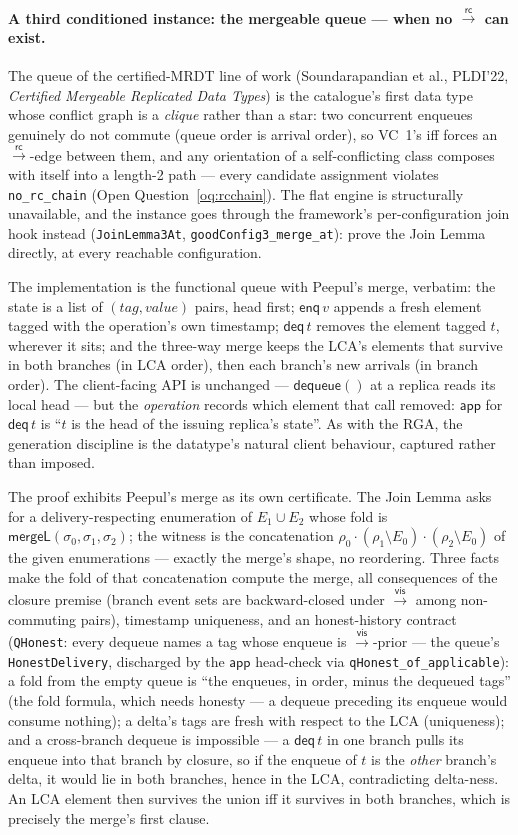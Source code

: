 \documentclass[11pt]{article}
\newcommand{\vis}{\xrightarrow{\mathsf{vis}}}
\newcommand{\rc}{\xrightarrow{\mathsf{rc}}}
\newcommand{\lean}[1]{\texttt{#1}}
\newcommand{\app}{\mathsf{app}}
\begin{document}
\paragraph{A third conditioned instance: the mergeable queue --- when no
$\rc$ can exist.} The queue of the certified-MRDT line of work
(Soundarapandian et al., PLDI'22, \emph{Certified Mergeable Replicated Data
Types}) is the catalogue's first data type whose conflict graph is a
\emph{clique} rather than a star: two concurrent enqueues genuinely do not
commute (queue order is arrival order), so VC~1's iff forces an $\rc$-edge
between them, and any orientation of a self-conflicting class composes with
itself into a length-2 path --- every candidate assignment violates
\lean{no\_rc\_chain} (Open Question~\ref{oq:rcchain}). The flat engine is
structurally unavailable, and the instance goes through the framework's
per-configuration join hook instead (\lean{JoinLemma3At},
\lean{goodConfig3\_merge\_at}): prove the Join Lemma directly, at every
reachable configuration.

The implementation is the functional queue with Peepul's merge, verbatim:
the state is a list of $(\mathit{tag}, \mathit{value})$ pairs, head first;
$\mathsf{enq}\,v$ appends a fresh element tagged with the operation's own
timestamp; $\mathsf{deq}\,t$ removes the element tagged $t$, wherever it
sits; and the three-way merge keeps the LCA's elements that survive in both
branches (in LCA order), then each branch's new arrivals (in branch order).
The client-facing API is unchanged --- $\mathsf{dequeue}()$ at a replica
reads its local head --- but the \emph{operation} records which element that
call removed: $\app$ for $\mathsf{deq}\,t$ is ``$t$ is the head of the
issuing replica's state''. As with the RGA, the generation discipline is the
datatype's natural client behaviour, captured rather than imposed.

The proof exhibits Peepul's merge as its own certificate. The Join Lemma
asks for a delivery-respecting enumeration of $E_1 \cup E_2$ whose fold is
$\mathsf{mergeL}(\sigma_0, \sigma_1, \sigma_2)$; the witness is the
concatenation $\rho_0 \cdot (\rho_1 \setminus E_0) \cdot (\rho_2 \setminus
E_0)$ of the given enumerations --- exactly the merge's shape, no
reordering. Three facts make the fold of that concatenation compute the
merge, all consequences of the closure premise (branch event sets are
backward-closed under $\vis$ among non-commuting pairs), timestamp
uniqueness, and an honest-history contract (\lean{QHonest}: every dequeue
names a tag whose enqueue is $\vis$-prior --- the queue's
\lean{HonestDelivery}, discharged by the $\app$ head-check via
\lean{qHonest\_of\_applicable}): a fold from the empty queue is ``the
enqueues, in order, minus the dequeued tags'' (the fold formula, which
needs honesty --- a dequeue preceding its enqueue would consume nothing); a
delta's tags are fresh with respect to the LCA (uniqueness); and a
cross-branch dequeue is impossible --- a $\mathsf{deq}\,t$ in one branch
pulls its enqueue into that branch by closure, so if the enqueue of $t$ is
the \emph{other} branch's delta, it would lie in both branches, hence in
the LCA, contradicting delta-ness. An LCA element then survives the union
iff it survives in both branches, which is precisely the merge's first
clause.
\end{document}
